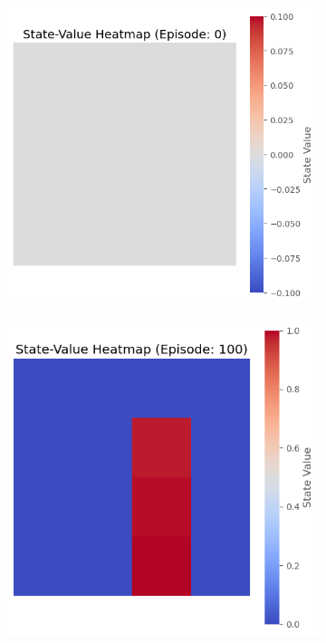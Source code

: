\documentclass{article}
\begin{document}
\begin{figure}[htp]
    \centering
    \begin{subfigure}{0.3\textwidth}
        \centering
        \includegraphics[width=\linewidth]{images/frozen_0.png}
        \caption{}
        \label{fig:t0}
    \end{subfigure}
    \hfill
    \begin{subfigure}{0.3\textwidth}
        \centering
        \includegraphics[width=\linewidth]{images/frozen_100.png}

\end{subfigure}
\end{figure}
\end{document}
